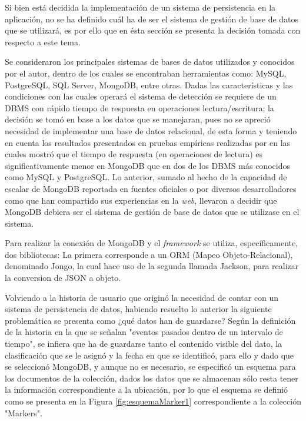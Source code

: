 Si bien está decidida la implementación de un sistema de persistencia en la aplicación, no se ha definido cuál ha de ser el sistema de gestión de base de datos que se utilizará, es por ello que en ésta sección se presenta la decisión tomada con respecto a este tema.

Se consideraron los principales sistemas de bases de datos utilizados y conocidos por el autor, dentro de los cuales se encontraban herramientas como: MySQL, PostgreSQL, SQL Server, MongoDB, entre otras. Dadas las características y las condiciones con las cuales operará el sistema de detección se requiere de un DBMS con rápido tiempo de respuesta en operaciones lectura/escritura; la decisión se tomó en base a los datos que se manejaran, pues no se apreció necesidad de implementar una base de datos relacional, de esta forma y teniendo en cuenta los resultados presentados en pruebas empíricas realizadas por \cite{MongoPerformance} en las cuales mostró que el tiempo de respuesta (en operaciones de lectura) es significativamente menor en MongoDB que en dos de los DBMS más conocidos como MySQL y PostgreSQL. Lo anterior, sumado al hecho de la capacidad de escalar de MongoDB reportada en fuentes oficiales o por diversos desarrolladores como \cite{MongoDBScalability} que han compartido sus experiencias en la \textit{web}, llevaron a decidir que MongoDB debiera ser el sistema de gestión de base de datos que se utilizase en el sistema.

Para realizar la conexión de MongoDB y el \textit{framework} se utiliza, específicamente, dos bibliotecas: La primera corresponde a un ORM (Mapeo Objeto-Relacional), denominado Jongo, la cual hace uso de la segunda llamada Jackson, para realizar la conversion de JSON a objeto.

Volviendo a la historia de usuario que originó la necesidad de contar con un sistema de persistencia de datos, habiendo resuelto lo anterior la siguiente problemática se presenta como ¿qué datos han de guardarse? Según la definición de la historia en la que se señalan "eventos pasados dentro de un intervalo de tiempo", se infiera que ha de guardarse tanto el contenido visible del dato, la clasificación que se le asignó y la fecha en que se identificó, para ello y dado que se seleccionó MongoDB, y aunque no es necesario, se especificó un esquema para los documentos de la colección, dados los datos que se almacenan sólo resta tener la información correspondiente a la ubicación, por lo que el esquema se definió como se presenta en la Figura \ref{fig:esquemaMarker1} correspondiente a la colección "Markers".

